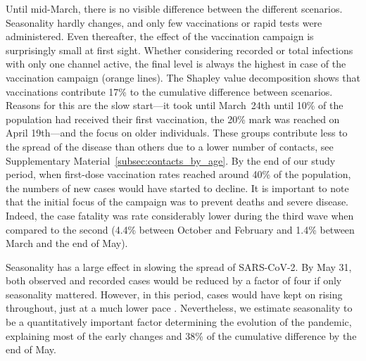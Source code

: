 \begin{figure}[!tp]
\end{figure}

Until mid-March, there is no visible difference between the different scenarios.
Seasonality hardly changes, and only few vaccinations or rapid tests were administered.
Even thereafter, the effect of the vaccination campaign is surprisingly small at first
sight. Whether considering recorded or total infections with only one channel active,
the final level is always the highest in case of the vaccination campaign (orange
lines). The Shapley value decomposition shows that vaccinations contribute 17\% to the
cumulative difference between scenarios. Reasons for this are the slow start---it took
until March~24th until 10\% of the population had received their first vaccination, the
20\% mark was reached on April 19th---and the focus on older individuals. These groups
contribute less to the spread of the disease than others due to a lower number of
contacts, see Supplementary Material~\ref{subsec:contacts_by_age}. By the end of our
study period, when first-dose vaccination rates reached around 40\% of the population,
the numbers of new cases would have started to decline. It is important to note that the
initial focus of the campaign was to prevent deaths and severe disease. Indeed, the case
fatality was rate considerably lower during the third wave when compared to the second
(4.4\% between October and February and 1.4\% between March and the end of May).

Seasonality has a large effect in slowing the spread of SARS-CoV-2. By May 31, both
observed and recorded cases would be reduced by a factor of four if only seasonality
mattered. However, in this period, cases would have kept on rising throughout, just at a
much lower pace \citep[this is in line with results in][]{Gavenciak2021}. Nevertheless,
we estimate seasonality to be a quantitatively important factor determining the
evolution of the pandemic, explaining most of the early changes and 38\% of the
cumulative difference by the end of May.

